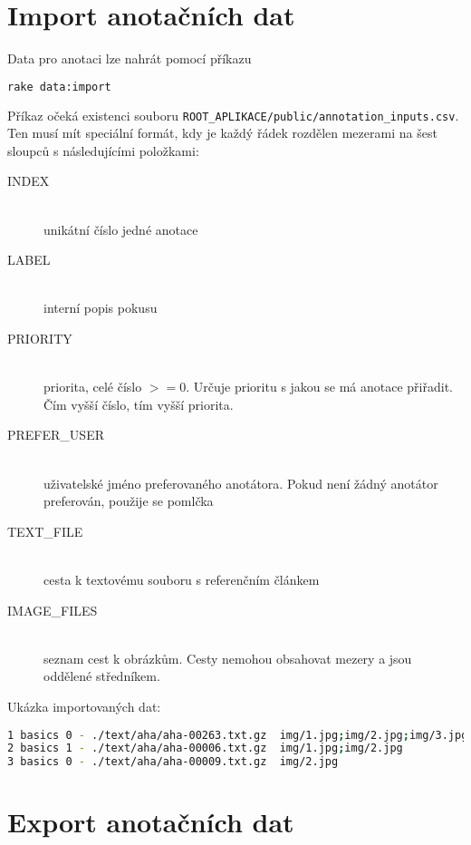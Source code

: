 \section{Import anotačních dat}

Data pro anotaci lze nahrát pomocí příkazu

\begin{lstlisting}[language=bash]
rake data:import
\end{lstlisting}

Příkaz očeká existenci souboru \lstinline{ROOT_APLIKACE/public/annotation_inputs.csv}. Ten musí mít speciální formát, kdy je každý řádek rozdělen mezerami na šest sloupců s následujícími položkami:

\begin{description}

\item[INDEX] \hfill \\
  unikátní číslo jedné anotace
\item[LABEL] \hfill \\
 interní popis pokusu
\item[PRIORITY] \hfill \\
 priorita, celé číslo $>= 0$. Určuje prioritu s jakou se má anotace přiřadit. Čím vyšší číslo, tím vyšší priorita.

\item[PREFER\_USER] \hfill \\
 uživatelské jméno preferovaného anotátora. Pokud není žádný anotátor preferován, použije se pomlčka
\item[TEXT\_FILE] \hfill \\
 cesta k textovému souboru s referenčním článkem
\item[IMAGE\_FILES] \hfill \\
 seznam cest k obrázkům. Cesty nemohou obsahovat mezery a jsou oddělené středníkem.
\end{description}

Ukázka importovaných dat:

\begin{lstlisting}[language=bash]
1 basics 0 - ./text/aha/aha-00263.txt.gz  img/1.jpg;img/2.jpg;img/3.jpg
2 basics 1 - ./text/aha/aha-00006.txt.gz  img/1.jpg;img/2.jpg
3 basics 0 - ./text/aha/aha-00009.txt.gz  img/2.jpg
\end{lstlisting}

\section{Export anotačních dat}

